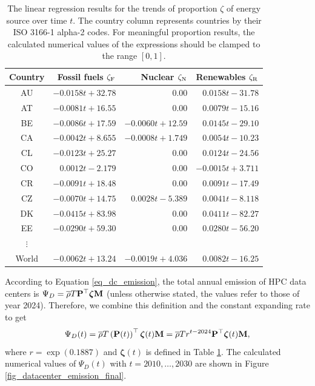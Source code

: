 \documentclass[12pt]{article}
\begin{document}
\begin{table}[!t]
	\centering
	\caption{The linear regression results for the trends of proportion $\zeta$ of energy source over time $t$. The country column represents countries by their ISO 3166-1 alpha-2 codes. For meaningful proportion results, the calculated numerical values of the expressions should be clamped to the range $\left[0, 1\right]$.}
	\label{table_mix_trend_eqs}
	\small
	\begin{tabular}{c|r|r|r}
		\hline
		\textbf{Country} & \textbf{Fossil fuels} $\zeta_{\rm F}$
		& \textbf{Nuclear} $\zeta_{\rm N}$ & \textbf{Renewables} $\zeta_{\rm R}$ \\
		\hline
		AU & $-0.0158t + 32.78$ & 0.00 & $0.0158t - 31.78$ \\
		AT & $-0.0081t + 16.55$ & 0.00 & $0.0079t - 15.16$ \\
		BE & $-0.0086t + 17.59$ & $-0.0060t + 12.59$ & $0.0145t - 29.10$ \\
		CA & $-0.0042t + 8.655$ & $-0.0008t + 1.749$ & $0.0054t - 10.23$ \\
		CL & $-0.0123t + 25.27$ & 0.00 & $0.0124t - 24.56$ \\
		CO & $0.0012t - 2.179$ & 0.00 & $-0.0015t + 3.711$ \\
		CR & $-0.0091t + 18.48$ & 0.00 & $0.0091t - 17.49$ \\
		CZ & $-0.0070t + 14.75$ & $0.0028t - 5.389$ & $0.0041t - 8.118$ \\
		DK & $-0.0415t + 83.98$ & 0.00 & $0.0411t - 82.27$ \\
		EE & $-0.0290t + 59.30$ & 0.00 & $0.0280t - 56.20$ \\
		$\vdots$ &&& \\
		World & $-0.0062t + 13.24$ & $-0.0019t + 4.036$ & $0.0082t - 16.25$ \\
		\hline
	\end{tabular}
\end{table}

According to Equation \ref{eq_dc_emission}, the total annual  emission of HPC data centers is $\Psi_D = \overline{\rho} T \vb{P}^\top \boldsymbol{\zeta} \vb{M}$ (unless otherwise stated, the values refer to those of year 2024). Therefore, we combine this definition and the constant expanding rate to get
\begin{equation}
	\Psi_D (t) = \overline{\rho} T \left(\vb{P}(t)\right)^\top \boldsymbol{\zeta}(t) \vb{M}
	= \overline{\rho} T r^{t - 2024} \vb{P}^\top \boldsymbol{\zeta}(t) \vb{M},
\end{equation}
where $r = \exp \left(0.1887\right)$ and $\boldsymbol{\zeta}(t)$ is defined in Table \ref{table_mix_trend_eqs}. The calculated numerical values of $\Psi_D(t)$ with $t = 2010, \dots, 2030$ are shown in Figure \ref{fig_datacenter_emission_final}.
\end{document}
